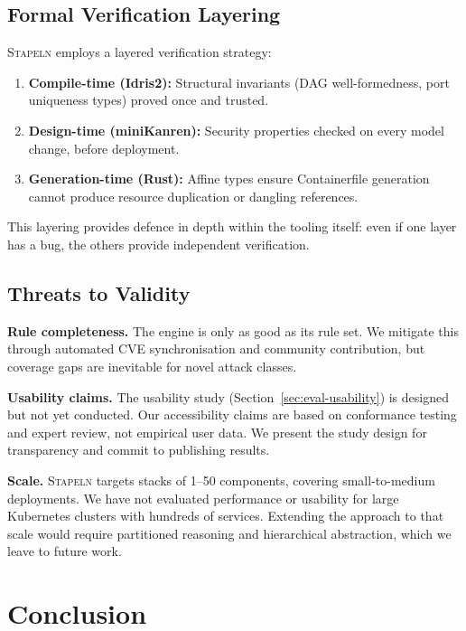 \documentclass[11pt,twocolumn]{article}
\newcommand{\stapeln}{\textsc{Stapeln}\xspace}
\begin{document}
\subsection{Formal Verification Layering}

\stapeln employs a layered verification strategy:

\begin{enumerate}[leftmargin=*]
\item \textbf{Compile-time (Idris2):} Structural invariants (DAG
      well-formedness, port uniqueness types) proved once and trusted.
\item \textbf{Design-time (miniKanren):} Security properties checked
      on every model change, before deployment.
\item \textbf{Generation-time (Rust):} Affine types ensure
      Containerfile generation cannot produce resource duplication
      or dangling references.
\end{enumerate}

This layering provides defence in depth within the tooling itself:
even if one layer has a bug, the others provide independent
verification.

\subsection{Threats to Validity}

\textbf{Rule completeness.} The engine is only as good as its rule
set. We mitigate this through automated CVE synchronisation and
community contribution, but coverage gaps are inevitable for novel
attack classes.

\textbf{Usability claims.} The usability study (Section~\ref{sec:eval-usability})
is designed but not yet conducted. Our accessibility claims are
based on conformance testing and expert review, not empirical user
data. We present the study design for transparency and commit to
publishing results.

\textbf{Scale.} \stapeln targets stacks of 1--50 components, covering
small-to-medium deployments. We have not evaluated performance or
usability for large Kubernetes clusters with hundreds of services.
Extending the approach to that scale would require partitioned
reasoning and hierarchical abstraction, which we leave to future work.


\section{Conclusion}
\label{sec:conclusion}
\end{document}

